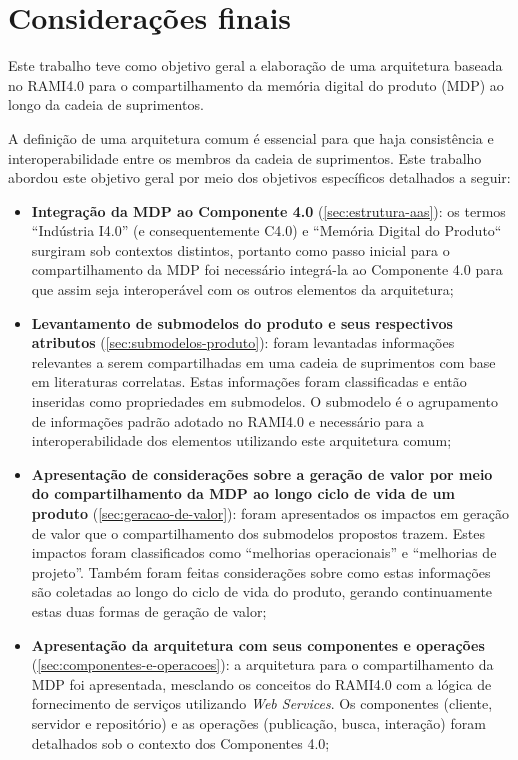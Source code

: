 \chapter{Considerações finais}
\label{cha:conclusao}

Este trabalho teve como objetivo geral a elaboração de uma arquitetura baseada no RAMI4.0 para o compartilhamento da memória digital do produto (MDP) ao longo da cadeia de suprimentos.

A definição de uma arquitetura comum é essencial para que haja consistência e interoperabilidade entre os membros da cadeia de suprimentos. Este trabalho abordou este objetivo geral por meio dos objetivos específicos detalhados a seguir:

\begin{itemize}
  \item \textbf{Integração da MDP ao Componente 4.0} (\autoref{sec:estrutura-aas}): os termos ``Indústria I4.0'' (e consequentemente C4.0) e ``Memória Digital do Produto`` surgiram sob contextos distintos, portanto como passo inicial para o compartilhamento da MDP foi necessário integrá-la ao Componente 4.0 para que assim seja interoperável com os outros elementos da arquitetura;
  \item \textbf{Levantamento de submodelos do produto e seus respectivos atributos} (\autoref{sec:submodelos-produto}): foram levantadas informações relevantes a serem compartilhadas em uma cadeia de suprimentos com base em literaturas correlatas. Estas informações foram classificadas e então inseridas como propriedades em submodelos. O submodelo é o agrupamento de informações padrão adotado no RAMI4.0 e necessário para a interoperabilidade dos elementos utilizando este arquitetura comum;
  \item \textbf{Apresentação de considerações sobre a geração de valor por meio do compartilhamento da MDP ao longo ciclo de vida de um produto} (\autoref{sec:geracao-de-valor}): foram apresentados os impactos em geração de valor que o compartilhamento dos submodelos propostos trazem. Estes impactos foram classificados como ``melhorias operacionais'' e ``melhorias de projeto''. Também foram feitas considerações sobre como estas informações são coletadas ao longo do ciclo de vida do produto, gerando continuamente estas duas formas de geração de valor;
  \item \textbf{Apresentação da arquitetura com seus componentes e operações} (\autoref{sec:componentes-e-operacoes}): a arquitetura para o compartilhamento da MDP foi apresentada, mesclando os conceitos do RAMI4.0 com a lógica de fornecimento de serviços utilizando \textit{Web Services}. Os componentes (cliente, servidor e repositório) e as operações (publicação, busca, interação) foram detalhados sob o contexto dos Componentes 4.0;

\end{itemize}

